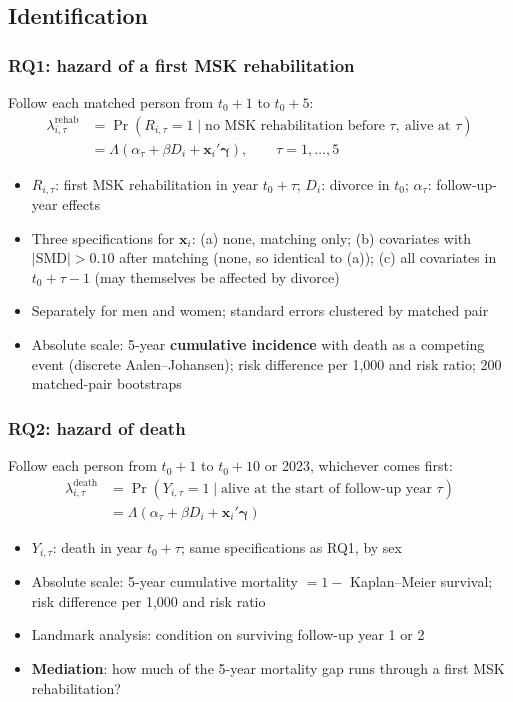 \documentclass[t,20pt]{beamer}
\newcommand{\hl}[1]{\textcolor{BiBViolett}{\textbf{#1}}}           %
\newcommand{\Lam}{\Lambda}
\begin{document}
\subsection{Identification}
\begin{bibframe}
  \frametitle{RQ1: hazard of a first MSK rehabilitation}
  Follow each matched person from $t_0+1$ to $t_0+5$:
  \begin{align*}
    \lambda^{\text{rehab}}_{i,\tau} &= \Pr\left(R_{i,\tau}=1 \mid \text{no MSK rehabilitation before } \tau,\ \text{alive at } \tau\right)\\
    &= \Lam\left(\alpha_\tau + \beta D_i + \mathbf{x}_i'\boldsymbol{\gamma}\right), \qquad \tau = 1,\dots,5
  \end{align*}
  {\small
  \begin{itemize}
    \item $R_{i,\tau}$: first MSK rehabilitation in year $t_0+\tau$; $D_i$: divorce in $t_0$; $\alpha_\tau$: follow-up-year effects
    \item Three specifications for $\mathbf{x}_i$: (a) none, matching only; (b) covariates with $|\text{SMD}|>0.10$ after matching (none, so identical to (a)); (c) all covariates in $t_0+\tau-1$ (may themselves be affected by divorce)
    \item Separately for men and women; standard errors clustered by matched pair
    \item Absolute scale: 5-year \hl{cumulative incidence} with death as a competing event (discrete Aalen--Johansen); risk difference per 1,000 and risk ratio; 200 matched-pair bootstraps
  \end{itemize}
  }
\end{bibframe}

\begin{bibframe}
  \frametitle{RQ2: hazard of death}
  Follow each person from $t_0+1$ to $t_0+10$ or 2023, whichever comes first:
  \begin{align*}
    \lambda^{\text{death}}_{i,\tau} &= \Pr\left(Y_{i,\tau}=1 \mid \text{alive at the start of follow-up year } \tau\right)\\
    &= \Lam\left(\alpha_\tau + \beta D_i + \mathbf{x}_i'\boldsymbol{\gamma}\right)
  \end{align*}
  \begin{itemize}
    \item $Y_{i,\tau}$: death in year $t_0+\tau$; same specifications as RQ1, by sex
    \item Absolute scale: 5-year cumulative mortality $=1-$ Kaplan--Meier survival; risk difference per 1,000 and risk ratio
    \item Landmark analysis: condition on surviving follow-up year 1 or 2
    \item[$\rightarrow$] \hl{Mediation}: how much of the 5-year mortality gap runs through a first MSK rehabilitation?
  \end{itemize}
\end{bibframe}
\end{document}
